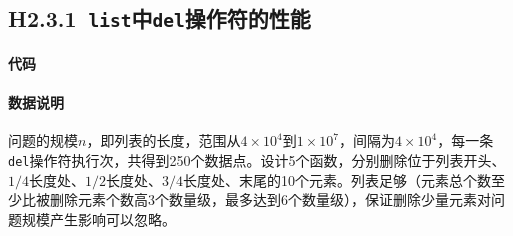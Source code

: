 \documentclass[a4 paper,fontset=windows]{ctexart}
\begin{document}
	\subsection{H2.3.1\ \texttt{list}中\texttt{del}操作符的性能}

	\paragraph{\textbf{代码}}
	

	\paragraph{数据说明}
	问题的规模$n$，即列表的长度，范围从$4\times10^4$到$1\times10^7$，间隔为$4\times10^4$，每一条\texttt{del}操作符执行次，共得到250个数据点。设计5个函数，分别删除位于列表开头、$1/4$长度处、$1/2$长度处、$3/4$长度处、末尾的10个元素。列表足够（元素总个数至少比被删除元素个数高3个数量级，最多达到6个数量级），保证删除少量元素对问题规模产生影响可以忽略。
\end{document}
